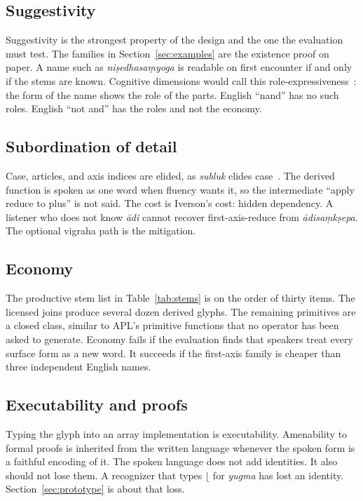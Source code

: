 \documentclass[manuscript, review, anonymous]{acmart}
\begin{document}
\subsection{Suggestivity}

Suggestivity is the strongest property of the design and the one the evaluation must test. The families in Section~\ref{sec:examples} are the existence proof on paper. A name such as \textit{ni{\d{s}}edhasa{\d{m}}yoga} is readable on first encounter if and only if the stems are known. Cognitive dimensions would call this role-expressiveness~\cite{Green1996Cognitive}: the form of the name shows the role of the parts. English ``nand'' has no such roles. English ``not and'' has the roles and not the economy.

\subsection{Subordination of detail}

Case, articles, and axis indices are elided, as \textit{subluk} elides case~\cite{Satuluri2013Generation}. The derived function is spoken as one word when fluency wants it, so the intermediate ``apply reduce to plus'' is not said. The cost is Iverson's cost: hidden dependency. A listener who does not know \textit{{\=a}di} cannot recover first-axis-reduce from \textit{{\=a}disa{\d{m}}k{\d{s}}epa}. The optional vigraha path is the mitigation.

\subsection{Economy}

The productive stem list in Table~\ref{tab:stems} is on the order of thirty items. The licensed joins produce several dozen derived glyphs. The remaining primitives are a closed class, similar to APL's primitive functions that no operator has been asked to generate. Economy fails if the evaluation finds that speakers treat every surface form as a new word. It succeeds if the first-axis family is cheaper than three independent English names.

\subsection{Executability and proofs}

Typing the glyph into an array implementation is executability. Amenability to formal proofs is inherited from the written language whenever the spoken form is a faithful encoding of it. The spoken language does not add identities. It also should not lose them. A recognizer that types $\lfloor$ for \textit{yugma} has lost an identity. Section~\ref{sec:prototype} is about that loss.
\end{document}
